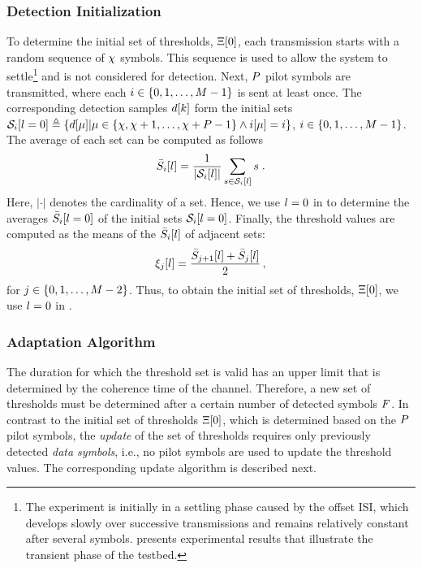 \subsubsection{Detection Initialization}
\scaleSubsubsectionBelow
%
To determine the initial set of thresholds, $\Xi[0]$, each transmission starts with a random sequence of $\chi$ symbols.
This sequence is used to allow the system to settle\footnote{The experiment is initially in a settling phase caused by the offset \ac{ISI}, which develops slowly over successive transmissions and remains relatively constant after several symbols.  presents experimental results that illustrate the transient phase of the testbed.} and is not considered for detection. Next, $P$ pilot symbols are transmitted, where each $i \in \{0, 1, \ldots, M - 1\}$ is sent at least once. The corresponding detection samples $d[k]$ form the initial sets $\mathcal{S}_{i}[l = 0] \triangleq \{d[\mu]|\mu \in \{\chi, \chi+1, \ldots, \chi+P-1\} \wedge i[\mu]=i\}$, $i \in \{0, 1, \ldots, M - 1\}$. The average of each set can be computed as follows
\begin{equation}
    \Bar{S}_i[l] = \frac{1}{|\mathcal{S}_{i}[l]|}\sum_{s\in \mathcal{S}_{i}[l]} s \;.
    \label{eq:average_set}
\end{equation}
Here, $|\cdot|$ denotes the cardinality of a set. Hence, we use $l = 0$ in  to determine the averages $\Bar{S}_i[l = 0]$ of the initial sets $\mathcal{S}_{i}[l = 0]$. Finally, the threshold values are computed as the means of the $\Bar{S}_i[l]$ of adjacent sets:
%
\begin{equation}\label{eq:nt}
    \xi_j[l] = \frac{\bar{S}_{j+1}[l] + \bar{S}_{j}[l]}{2}\,,
\end{equation}
for $j \in \{0, 1, \hdots, M-2\}$. Thus, to obtain the initial set of thresholds, $\Xi[0]$, we use $l = 0$ in .
%
\scaleSubsubsection
\subsubsection{Adaptation Algorithm}
\scaleSubsubsectionBelow
%
The duration for which the threshold set is valid has an upper limit that is determined by the coherence time of the channel. Therefore, a new set of thresholds must be determined after a certain number of detected symbols $F$. In contrast to the initial set of thresholds $\Xi[0]$, which is determined based on the $P$ pilot symbols, the \textit{update} of the set of thresholds requires only previously detected \textit{data symbols}, i.e., no pilot symbols are used to update the threshold values. The corresponding update algorithm is described next.

